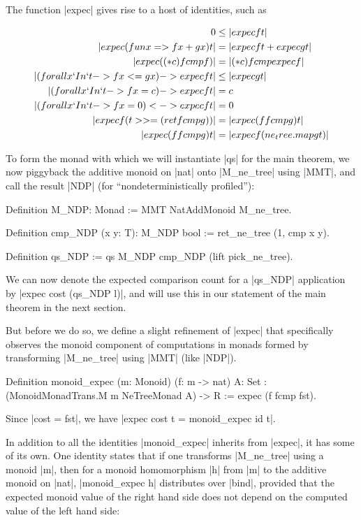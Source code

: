 \documentclass[runningheads]{llncs}
\begin{document}
The function |expec| gives rise to a host of identities, such as

\begin{align}
  0 &\le |expec f t| \nonumber \\
  |expec (fun x => f x + g x) t| &= |expec f t + expec g t| \nonumber \\
  |expec ((* c) fcmp f)| &= |(* c) fcmp expec f| \nonumber \\
  |(forall x `In` t -> f x <= g x) -> expec f t| &\le |expec g t| \nonumber \\
  |(forall x `In` t -> f x = c) -> expec f t| &= c \nonumber \\
  |(forall x `In` t -> f x = 0) <-> expec f t| &= 0 \nonumber \\
  |expec f (t >>= (ret fcmp g))| &= |expec (f fcmp g) t| \nonumber \\
  |expec (f fcmp g) t| &= |expec f (ne_tree.map g t)| \label{expec_bind_lem}
\end{align}

To form the monad with which we will instantiate |qs| for the main theorem, we now piggyback the additive monoid on |nat| onto |M_ne_tree| using |MMT|, and call the result |NDP| (for ``nondeterministically profiled''):
\begin{code}
  Definition M_NDP: Monad := MMT NatAddMonoid M_ne_tree.

  Definition cmp_NDP (x y: T): M_NDP bool := ret_ne_tree (1, cmp x y).

  Definition qs_NDP := qs M_NDP cmp_NDP (lift pick_ne_tree).
\end{code}
We can now denote the expected comparison count for a |qs_NDP| application by |expec cost (qs_NDP l)|, and will use this in our statement of the main theorem in the next section.

But before we do so, we define a slight refinement of |expec| that specifically observes the monoid component of computations in monads formed by transforming |M_ne_tree| using |MMT| (like |NDP|).
\begin{code}
  Definition monoid_expec (m: Monoid) (f: m -> nat) {A: Set}
    : (MonoidMonadTrans.M m NeTreeMonad A) -> R := expec (f fcmp fst).
\end{code}
Since |cost = fst|, we have |expec cost t = monoid_expec id t|.

In addition to all the identities |monoid_expec| inherits from |expec|, it has some of its own. One identity states that if one transforms |M_ne_tree| using a monoid |m|, then for a monoid homomorphism |h| from |m| to the additive monoid on |nat|, |monoid_expec h| distributes over |bind|, provided that the expected monoid value of the right hand side does not depend on the computed value of the left hand side:
\end{document}
